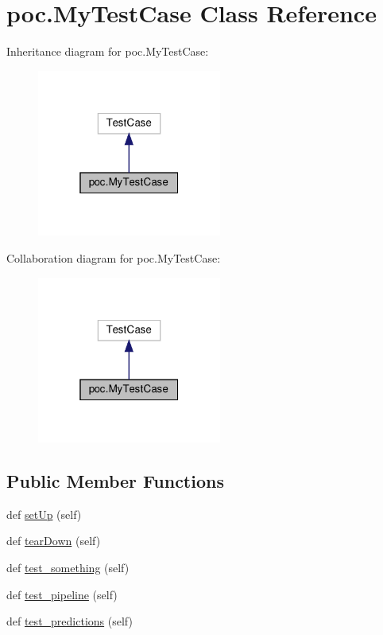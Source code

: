 \hypertarget{classpoc_1_1MyTestCase}{}\section{poc.\+My\+Test\+Case Class Reference}
\label{classpoc_1_1MyTestCase}


Inheritance diagram for poc.\+My\+Test\+Case\+:
\nopagebreak
\begin{figure}[H]
\begin{center}
\leavevmode
\includegraphics[width=172pt]{classpoc_1_1MyTestCase__inherit__graph}
\end{center}
\end{figure}


Collaboration diagram for poc.\+My\+Test\+Case\+:
\nopagebreak
\begin{figure}[H]
\begin{center}
\leavevmode
\includegraphics[width=172pt]{classpoc_1_1MyTestCase__coll__graph}
\end{center}
\end{figure}
\subsection*{Public Member Functions}
\begin{DoxyCompactItemize}
\item 
def \hyperlink{classpoc_1_1MyTestCase_a7ec60aeb38145ac607eac8c84e7771f1}{set\+Up} (self)
\item 
def \hyperlink{classpoc_1_1MyTestCase_abb8f6d9181868c897d8c139944cd9526}{tear\+Down} (self)
\item 
def \hyperlink{classpoc_1_1MyTestCase_a63d2f1e6ae79e384e94c9e685a83ee34}{test\+\_\+something} (self)
\item 
def \hyperlink{classpoc_1_1MyTestCase_a173a5696d070c6c3a75d840a7396c29a}{test\+\_\+pipeline} (self)
\item 
def \hyperlink{classpoc_1_1MyTestCase_ab64e498e1f16cf78c766186988274e9e}{test\+\_\+predictions} (self)
\end{DoxyCompactItemize}
